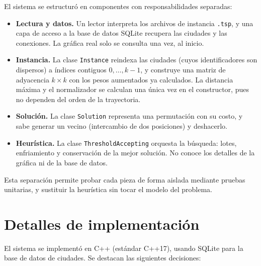 \documentclass[letterpaper,12pt]{article} %
\begin{document}
El sistema se estructuró en componentes con responsabilidades separadas:

\begin{itemize}
    \item \textbf{Lectura y datos.} Un lector interpreta los archivos de
    instancia \texttt{.tsp}, y una capa de acceso a la base de datos SQLite
    recupera las ciudades y las conexiones. La gráfica real solo se consulta una
    vez, al inicio.

    \item \textbf{Instancia.} La clase \texttt{Instance} reindexa las ciudades
    (cuyos identificadores son dispersos) a índices contiguos $0, \dots, k-1$, y
    construye una matriz de adyacencia $k \times k$ con los pesos aumentados ya
    calculados. La distancia máxima y el normalizador se calculan una única vez
    en el constructor, pues no dependen del orden de la trayectoria.

    \item \textbf{Solución.} La clase \texttt{Solution} representa una
    permutación con su costo, y sabe generar un vecino (intercambio de dos
    posiciones) y deshacerlo.

    \item \textbf{Heurística.} La clase \texttt{ThresholdAccepting} orquesta la
    búsqueda: lotes, enfriamiento y conservación de la mejor solución. No conoce
    los detalles de la gráfica ni de la base de datos.
\end{itemize}

Esta separación permite probar cada pieza de forma aislada mediante pruebas
unitarias, y sustituir la heurística sin tocar el modelo del problema.

\section{Detalles de implementación}

El sistema se implementó en C++ (estándar C++17), usando SQLite para la base de
datos de ciudades. Se destacan las siguientes decisiones:
\end{document}

